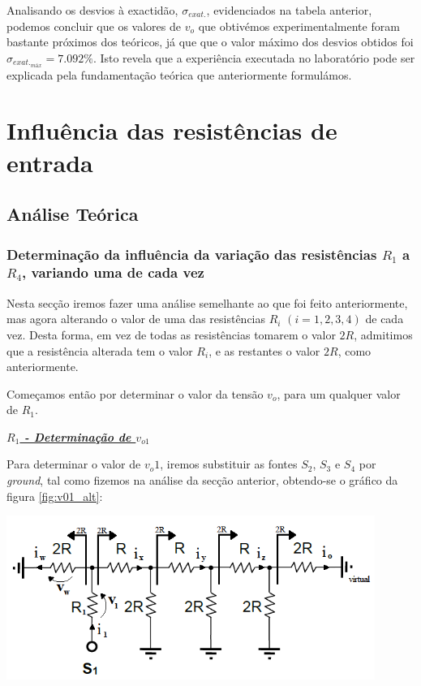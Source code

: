 \documentclass[a4paper,11pt]{report}
\begin{document}
Analisando os desvios à exactidão, $\sigma_{exat.}$, evidenciados na tabela anterior, podemos concluir que os valores de $v_o$ que obtivémos experimentalmente foram bastante próximos dos teóricos, já que que o valor máximo dos desvios obtidos foi $\sigma_{{exat.}_{máx}}=7.092\%$. Isto revela que a experiência executada no laboratório  pode ser explicada pela fundamentação teórica que anteriormente formulámos.

\chapter{Influência das resistências de entrada}

\section{Análise Teórica}

\subsection{Determinação da influência da variação das resistências $R_1$ a $R_4$, variando uma de cada vez}

Nesta secção iremos fazer uma análise semelhante ao que foi feito anteriormente, mas agora alterando o valor de uma das resistências $R_i$ $(i=1,2,3,4)$ de cada vez. Desta forma, em vez de todas as resistências tomarem o valor $2R$, admitimos que a resistência alterada tem o valor $R_i$, e as restantes o valor $2R$, como anteriormente.

Começamos então por determinar o valor da tensão $v_o$, para um qualquer valor de $R_1$.\\

\par

\large\underline{\textit{\textbf{$R_1$ - Determinação de $v_{o1}$}}}\\
\par

Para determinar o valor de $v_o1$, iremos substituir as fontes $S_2$, $S_3$ e $S_4$ por \textit{ground}, tal como fizemos na análise da secção anterior, obtendo-se o gráfico da figura \ref{fig:v01_alt}:

\begin{center}
     \includegraphics[angle=0,width=0.9\textwidth]{v01_alt.png}
     \label{fig:v01_alt}
     \end{center}
\end{document}
